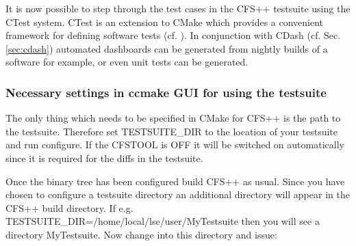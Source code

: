 It is now possible to step through the test cases in the CFS++ testsuite using
the CTest system.  CTest is an  extension to CMake which provides a convenient
framework for defining software  tests (cf. \cite{Martin2010}). In conjunction
with CDash  (cf. Sec. \ref{sec:cdash})  automated dashboards can  be generated
from  nightly builds of  a software  for example,  or even  unit tests  can be
generated.

\subsubsection{Necessary settings in ccmake GUI for using the testsuite}

The only thing which  needs to be specified in CMake for  CFS++ is the path to
the testsuite. Therefore set TESTSUITE\_DIR  to the location of your testsuite
and run configure.  If the CFSTOOL is OFF it will be switched on automatically
since it is required for the diffs in the testsuite.

Once the binary tree has been  configured build CFS++ as usual. Since you have
chosen to configure a testsuite  directory an additional directory will appear
in        the       CFS++        build        directory.        If        e.g.
TESTSUITE\_DIR=/home/local/lse/user/MyTestsuite then you  will see a directory
MyTestsuite. Now change into this directory and issue:

